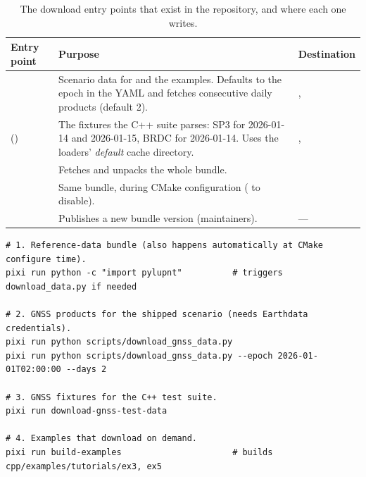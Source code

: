 \begin{table}[htbp]
  \centering
  \caption{The download entry points that exist in the repository, and where
    each one writes.}
  \label{tab:sp3-scripts}
  \small
  \begin{tabularx}{\textwidth}{@{}L L L@{}}
    \toprule
    Entry point & Purpose & Destination \\
    \midrule
     &
      Scenario data for  and the
       examples. Defaults to the epoch in the YAML and
      fetches  consecutive daily products (default 2). &
      ,  \\
     \newline
      () &
      The fixtures the C++ suite parses: SP3 for 2026-01-14 and 2026-01-15,
      BRDC for 2026-01-14. Uses the loaders' \emph{default} cache directory. &
      ,  \\
     &
      Fetches and unpacks the whole  bundle. &
       \\
     &
      Same bundle, during CMake configuration
      ( to disable). &
       \\
     &
      Publishes a new bundle version (maintainers). & --- \\
    \bottomrule
  \end{tabularx}
\end{table}

\begin{lstlisting}[language=shell, caption={Typical first-run sequence.}, label={lst:sp3-run}]
# 1. Reference-data bundle (also happens automatically at CMake configure time).
pixi run python -c "import pylupnt"          # triggers download_data.py if needed

# 2. GNSS products for the shipped scenario (needs Earthdata credentials).
pixi run python scripts/download_gnss_data.py
pixi run python scripts/download_gnss_data.py --epoch 2026-01-01T02:00:00 --days 2

# 3. GNSS fixtures for the C++ test suite.
pixi run download-gnss-test-data

# 4. Examples that download on demand.
pixi run build-examples                      # builds cpp/examples/tutorials/ex3, ex5
\end{lstlisting}


